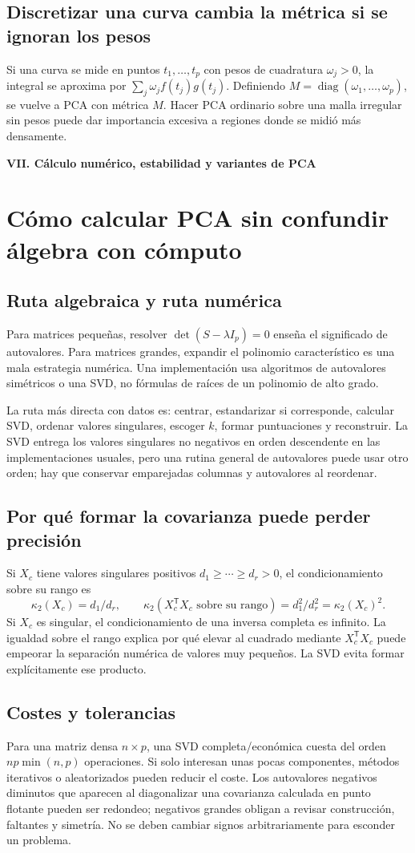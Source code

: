 \documentclass[11pt,a4paper]{article}
\newcommand{\T}{^{\mathsf T}}
\DeclareMathOperator{\diag}{diag}
\theoremstyle{definition}
\newcommand{\parte}[1]{\par\bigskip\Needspace{8\baselineskip}\begin{center}{\Large\bfseries\color{azul}#1}\end{center}}
\begin{document}
\subsection{Discretizar una curva cambia la métrica si se ignoran los pesos}
Si una curva se mide en puntos $t_1,\ldots,t_p$ con pesos de cuadratura $\omega_j>0$, la integral se aproxima por $\sum_j\omega_jf(t_j)g(t_j)$. Definiendo $M=\diag(\omega_1,\ldots,\omega_p)$, se vuelve a PCA con métrica $M$. Hacer PCA ordinario sobre una malla irregular sin pesos puede dar importancia excesiva a regiones donde se midió más densamente.

\parte{VII. Cálculo numérico, estabilidad y variantes de PCA}
\section{Cómo calcular PCA sin confundir álgebra con cómputo}
\subsection{Ruta algebraica y ruta numérica}
Para matrices pequeñas, resolver $\det(S-\lambda I_p)=0$ enseña el significado de autovalores. Para matrices grandes, expandir el polinomio característico es una mala estrategia numérica. Una implementación usa algoritmos de autovalores simétricos o una SVD, no fórmulas de raíces de un polinomio de alto grado.

La ruta más directa con datos es: centrar, estandarizar si corresponde, calcular SVD, ordenar valores singulares, escoger $k$, formar puntuaciones y reconstruir. La SVD entrega los valores singulares no negativos en orden descendente en las implementaciones usuales, pero una rutina general de autovalores puede usar otro orden; hay que conservar emparejadas columnas y autovalores al reordenar.
\subsection{Por qué formar la covarianza puede perder precisión}
Si $X_c$ tiene valores singulares positivos $d_1\ge\cdots\ge d_r>0$, el condicionamiento sobre su rango es
\[
\kappa_2(X_c)=d_1/d_r,\qquad
\kappa_2(X_c\T X_c\text{ sobre su rango})=d_1^2/d_r^2=\kappa_2(X_c)^2.
\]
Si $X_c$ es singular, el condicionamiento de una inversa completa es infinito. La igualdad sobre el rango explica por qué elevar al cuadrado mediante $X_c\T X_c$ puede empeorar la separación numérica de valores muy pequeños. La SVD evita formar explícitamente ese producto.
\subsection{Costes y tolerancias}
Para una matriz densa $n\times p$, una SVD completa/económica cuesta del orden $np\min(n,p)$ operaciones. Si solo interesan unas pocas componentes, métodos iterativos o aleatorizados pueden reducir el coste. Los autovalores negativos diminutos que aparecen al diagonalizar una covarianza calculada en punto flotante pueden ser redondeo; negativos grandes obligan a revisar construcción, faltantes y simetría. No se deben cambiar signos arbitrariamente para esconder un problema.
\end{document}
